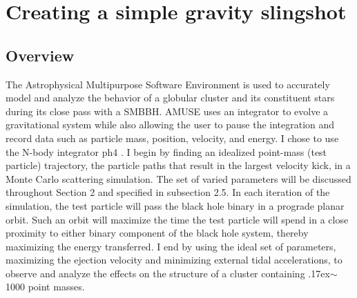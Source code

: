 \documentclass{aastex62}
\begin{document}
\section{Creating a simple gravity slingshot}
\subsection{Overview}
The Astrophysical Multipurpose Software Environment \citep{zwart18} is used to accurately model and analyze the behavior of a globular cluster and its constituent stars during its close pass with a SMBBH. AMUSE uses an integrator to evolve a gravitational system while also allowing the user to pause the integration and record data such as particle mass, position, velocity, and energy. I chose to use the N-body integrator ph4 \citep{McM12}. I begin by finding an idealized point-mass (test particle) trajectory, the particle paths that result in the largest velocity kick, in a Monte Carlo scattering simulation. The set of varied parameters will be discussed throughout Section 2 and specified in subsection 2.5. In each iteration of the simulation, the test particle will pass the black hole binary in a prograde planar orbit. Such an orbit will maximize the time the test particle will spend in a close proximity to either binary component of the black hole system, thereby maximizing the energy transferred. I end by using the ideal set of parameters, maximizing the ejection velocity and minimizing external tidal accelerations, to observe and analyze the effects on the structure of a cluster containing {\raise.17ex\hbox{$\scriptstyle\mathtt{\sim}$}}1000 point masses. 
\end{document}
